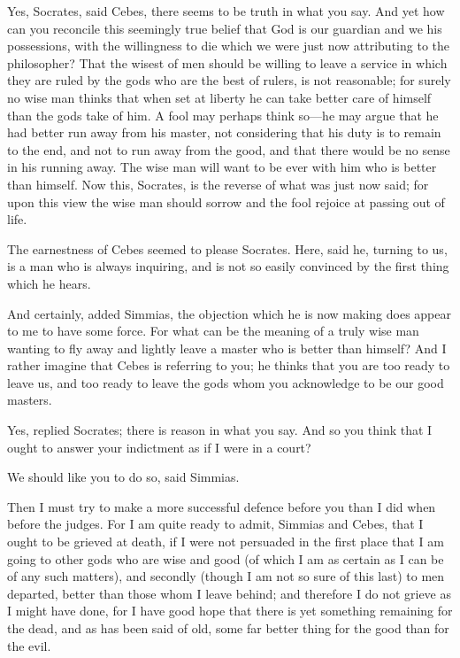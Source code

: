 Yes, Socrates, said Cebes, there seems to be truth in what you say. And
yet how can you reconcile this seemingly true belief that God is our
guardian and we his possessions, with the willingness to die which we were
just now attributing to the philosopher? That the wisest of men should be
willing to leave a service in which they are ruled by the gods who are the
best of rulers, is not reasonable; for surely no wise man thinks that when
set at liberty he can take better care of himself than the gods take of
him. A fool may perhaps think so—he may argue that he had better run
away from his master, not considering that his duty is to remain to the
end, and not to run away from the good, and that there would be no sense
in his running away. The wise man will want to be ever with him who is
better than himself. Now this, Socrates, is the reverse of what was just
now said; for upon this view the wise man should sorrow and the fool
rejoice at passing out of life.

The earnestness of Cebes seemed to please Socrates. Here, said he, turning
to us, is a man who is always inquiring, and is not so easily convinced by
the first thing which he hears.

And certainly, added Simmias, the objection which he is now making does
appear to me to have some force. For what can be the meaning of a truly
wise man wanting to fly away and lightly leave a master who is better than
himself? And I rather imagine that Cebes is referring to you; he thinks
that you are too ready to leave us, and too ready to leave the gods whom
you acknowledge to be our good masters.

Yes, replied Socrates; there is reason in what you say. And so you think
that I ought to answer your indictment as if I were in a court?

We should like you to do so, said Simmias.

Then I must try to make a more successful defence before you than I did
when before the judges. For I am quite ready to admit, Simmias and Cebes,
that I ought to be grieved at death, if I were not persuaded in the first
place that I am going to other gods who are wise and good (of which I am
as certain as I can be of any such matters), and secondly (though I am not
so sure of this last) to men departed, better than those whom I leave
behind; and therefore I do not grieve as I might have done, for I have
good hope that there is yet something remaining for the dead, and as has
been said of old, some far better thing for the good than for the evil.

